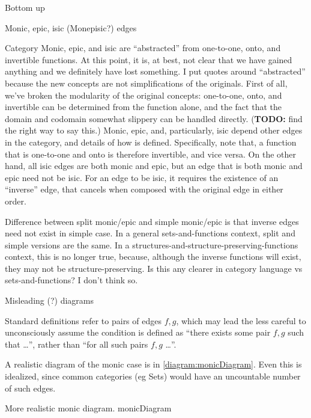 \begin{plSection}{Bottom up}
\begin{plSection}{Monic, epic, isic (Monepisic?) edges}
\begin{plSection}{Category}
Monic, epic, and isic are ``abstracted'' 
from one-to-one, onto, and invertible functions.
At this point, it is, at best, not clear that we have gained
anything and we definitely have lost something.
I put quotes around ``abstracted'' because the new concepts are
not simplifications of the originals.
First of all, 
we've broken the modularity of the original concepts:
one-to-one, onto, and invertible can be determined from
the function alone, and the fact that the domain and codomain
somewhat slippery can be handled directly.
(\textbf{TODO:} find the right way to say this.)
Monic, epic, and, particularly, isic depend other edges in the category, 
and details of how \compose is defined.
Specifically, note that,
a function that is one-to-one and onto is
therefore invertible, and vice versa.
On the other hand, all isic edges are both monic and epic,
but an edge that is both monic and epic need not be isic.
For an edge to be isic, it requires the existence of an ``inverse''
edge, that cancels when composed with the original edge 
in either order.

Difference between split monic/epic and simple monic/epic
is that inverse edges need not exist in simple case.
In a general sets-and-functions context, split and simple versions
are the same.
In a structures-and-structure-preserving-functions context,
this is no longer true, because, although the inverse functions
will exist, they may not be structure-preserving.
Is this any clearer in category language vs sets-and-functions?
I don't think so.
\end{plSection}
\begin{plSection}{Misleading (?) diagrams}

Standard definitions refer to pairs of edges $f, g$,
which may lead the less careful to unconsciously assume
the condition is defined as 
``there exists some pair $f,g$ such that \ldots'',
rather than
``for all such pairs $f,g$ \ldots''.

A realistic diagram of the monic case 
is in \cref{diagram:monicDiagram}.
Even this is idealized, since common categories (eg Sets)
would have an uncountable number of such edges.

\begin{plDiagram}
{More realistic monic diagram.}
{monicDiagram}
\centering
{}
\end{plDiagram}


\end{plSection}
\end{plSection}
\end{plSection}
